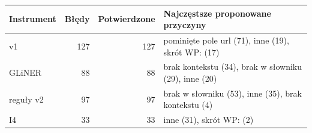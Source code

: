 \begin{tabular}{lrrp{8.2cm}}
\toprule
Instrument & Błędy & Potwierdzone & Najczęstsze proponowane przyczyny \\
\midrule
v1 & 127 & 127 & pominięte pole url (71), inne (19), skrót WP: (17) \\
GLiNER & 88 & 88 & brak kontekstu (34), brak w słowniku (29), inne (20) \\
reguły v2 & 97 & 97 & brak w słowniku (53), inne (35), brak kontekstu (4) \\
I4 & 33 & 33 & inne (31), skrót WP: (2) \\
\bottomrule
\end{tabular}
